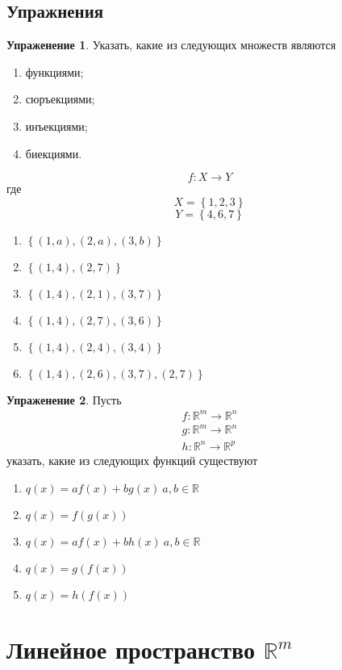 \documentclass[]{article}
\theoremstyle{theorem}
\theoremstyle{definition}
\newtheorem{tk}{Упраженение}
\begin{document}
	\subsection{Упражнения}
\begin{tk}
		Указать, какие из следующих множеств являются
	\begin{enumerate}
		\item функциями;
		\item сюръекциями;
		\item инъекциями;
		\item биекциями.
	\end{enumerate} $$f:X\rightarrow Y$$ где $$X=\left\{1,2,3\right\}$$  $$Y=\left\{4,6,7\right\}$$
	
	\begin{enumerate}
		\item $\left\{(1,a),(2,a),(3,b)\right\}$ 
		\item $\left\{(1,4),(2,7)\right\}$ 
		\item $\left\{(1,4),(2,1),(3,7)\right\}$ 
		\item $\left\{(1,4),(2,7),(3,6)\right\}$
		\item $\left\{(1,4),(2,4),(3,4)\right\}$  
		\item $\left\{(1,4),(2,6),(3,7),(2,7)\right\}$  
	\end{enumerate}
\end{tk}

\begin{tk}
		Пусть \begin{gather*}
		f:\mathbb{R}^m\rightarrow\mathbb{R}^n
		\\
		g:\mathbb{R}^m\rightarrow\mathbb{R}^n
		\\
		h:\mathbb{R}^n\rightarrow\mathbb{R}^p
	\end{gather*}
	указать, какие из следующих функций существуют
	
	\begin{enumerate}
		\item $q(x)=af(x)+bg(x)\ a,b\in\mathbb{R}$
		\item $q(x)=f(g(x))$
		\item $q(x)=af(x)+bh(x)\ a,b\in\mathbb{R}$
		\item $q(x)=g(f(x))$
		\item $q(x)=h(f(x))$
	\end{enumerate}
\end{tk}
	
	\section{Линейное пространство $\mathbb{R}^m$}\label{sc1}
	
\end{document}
